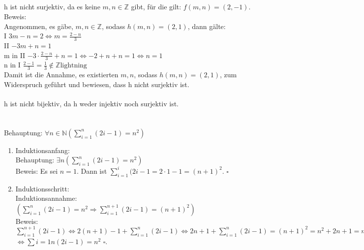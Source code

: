 \documentclass[fleqn]{article}
\newcommand{\N}{\mathbb{N}}
\newcommand{\Z}{\mathbb{Z}}
\begin{document}
\subsection{}
h ist nicht surjektiv, da es keine $m,n \in \Z$ gibt, für die gilt: $f(m,n) = (2,-1)$.\\
Beweis:\\
Angenommen, es gäbe, $m,n \in \Z$, sodass $h(m,n) = (2,1)$, dann gälte:\\
I   $3m - n = 2 \Leftrightarrow m = \frac{2-n}{3}$\\
II  $-3m + n = 1$\\
m in II  $-3 \cdot \frac{2-n}{3} + n = 1 \Leftrightarrow -2 + n + n = 1 \Leftrightarrow n = 1$\\
n in I  $\frac{2-1}{3} = \frac{1}{3} \notin \Z \text{lightning}$\\
Damit ist die Annahme, es existierten $m,n$, sodass $h(m,n) = (2,1)$, zum Widerspruch geführt und bewiesen, dass h nicht surjektiv ist.\\
\\
h ist nicht bijektiv, da h weder injektiv noch surjektiv ist.
\section{}
Behauptung: $\forall n \in \N (\sum\limits_{i=1}^{n} (2i-1) = n^2)$\\
\begin{enumerate}[I]
\item Induktionsanfang:\\
    Behauptung: $\exists n (\sum\limits_{i=1}^{n}(2i-1) = n^2)$\\
    Beweis: Es sei $n = 1$. Dann ist $\sum\limits_{i=1}^{i}(2i-1 = 2 \cdot 1 - 1 = (n+1)^2$. $\square$\\
\item Induktionsschritt:\\
    Induktionsannahme: $(\sum\limits_{i=1}^{n} (2i - 1) = n^2 \Rightarrow \sum\limits_{i = 1}^{n + 1}(2i-1) = (n+1)^2)$\\
    Beweis:\\
    $\sum\limits_{i=1}^{n+1}(2i-1) \Leftrightarrow 2(n+1) - 1 + \sum\limits_{i=1}^{n}(2i-1) \Leftrightarrow 2n + 1 + \sum\limits_{i=1}^{n}(2i-1) = (n+1)^2 = n^2 + 2n + 1 = n^2 + 2n + 1$\\
    $\Leftrightarrow \sum\limits{i=1}{n}(2i-1) = n^2$ $\square$.
\end{enumerate}
\end{document}

